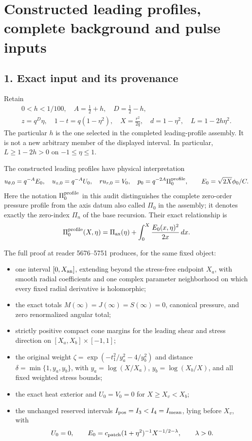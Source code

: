\documentclass[10pt,a4paper]{article}
\providecommand{\tightlist}{\setlength{\itemsep}{0pt}\setlength{\parskip}{0pt}}
\begin{document}
\section{Constructed leading profiles, complete background and pulse inputs}\label{gclosure:constructed-leading-profiles-complete-background-and-pulse-inputs}

\subsection{1. Exact input and its provenance}\label{gclosure:exact-input-and-its-provenance}

Retain \[
\begin{gathered}
0<h<1/100,\quad A=\tfrac12+h,\quad D=\tfrac12-h,\\
z=q^D\eta,\quad 1-t=q(1-\eta^2),\quad X=\frac{r^2}{2q},
\quad d=1-\eta^2,\quad L=1-2h\eta^2.
\end{gathered}
\] The particular \(h\) is the one selected in the completed leading-profile assembly. It is not a new arbitrary member of the displayed interval. In particular, \(L\ge1-2h>0\) on \(-1\le\eta\le1\).

The constructed leading profiles have physical interpretation \[
u_{\theta,0}=q^{-A}E_0,\quad u_{z,0}=q^{-A}U_0,\quad
ru_{r,0}=V_0,\quad p_0=q^{-2A}\Pi_0^{\rm profile},
\qquad E_0=\sqrt{2X}\phi_0/C.
\] Here the notation \(\Pi_0^{\rm profile}\) in this audit distinguishes the complete zero-order pressure profile from the axis datum also called \(\Pi_0\) in the assembly; it denotes exactly the zero-index \(\Pi_n\) of the base recursion. Their exact relationship is \[
\Pi_0^{\rm profile}(X,\eta)=\Pi_{\rm ax}(\eta)+\int_0^X\frac{E_0(x,\eta)^2}{2x}\,dx.
\]

The full proof at reader 5676--5751 produces, for the same fixed object:

\begin{itemize}
\tightlist
\item
  one interval \([0,X_{\rm an}]\), extending beyond the stress-free endpoint \(X_a\), with smooth radial coefficients and one complex parameter neighborhood on which every fixed radial derivative is holomorphic;
\item
  the exact totals \(M(\infty)=J(\infty)=S(\infty)=0\), canonical pressure, and zero renormalized angular total;
\item
  strictly positive compact cone margins for the leading shear and stress direction on \([X_a,X_b]\times[-1,1]\);
\item
  the original weight \(\zeta=\exp(-t_1^2/y_a^2-4/y_b^2)\) and distance \(\delta=\min\{1,y_a,y_b\}\), with \(y_a=\log(X/X_a)\), \(y_b=\log(X_b/X)\), and all fixed weighted stress bounds;
\item
  the exact heat exterior and \(U_0=V_0=0\) for \(X\ge X_v<X_b\);
\item
  the unchanged reserved intervals \(I_{\rm pos}=I_3<I_4=I_{\rm mean}\), lying before \(X_v\), with \[
  U_0=0,\qquad E_0=c_{\rm patch}(1+\eta^2)^{-1}X^{-1/2-\lambda},\qquad\lambda>0.
  \]
\end{itemize}
\end{document}
